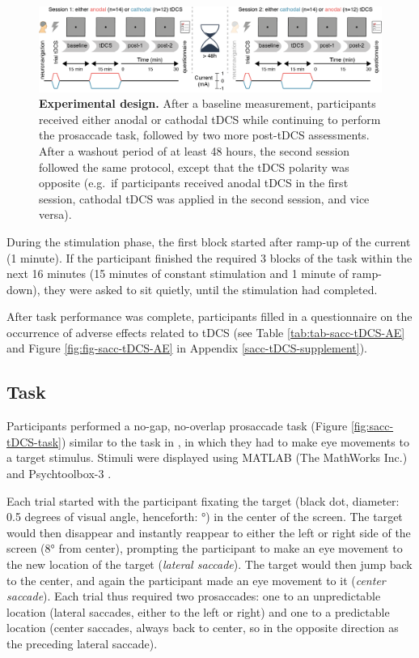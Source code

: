 \documentclass[11pt,english,]{memoir}
\begin{document}
\begin{figure}
\includegraphics[width=130mm]{sacc_tDCS_files/figures/figure_1_procedure} \caption{\textbf{Experimental design.} After a baseline measurement, participants received either anodal or cathodal tDCS while continuing to perform the prosaccade task, followed by two more post-tDCS assessments. After a washout period of at least 48 hours, the second session followed the same protocol, except that the tDCS polarity was opposite (e.g.~if participants received anodal tDCS in the first session, cathodal tDCS was applied in the second session, and vice versa).}\label{fig:sacc-tDCS-procedure}
\end{figure}



During the stimulation phase, the first block started after ramp-up of the current (1 minute). If the participant finished the required 3 blocks of the task within the next 16 minutes (15 minutes of constant stimulation and 1 minute of ramp-down), they were asked to sit quietly, until the stimulation had completed.

After task performance was complete, participants filled in a questionnaire on the occurrence of adverse effects related to tDCS (see Table \ref{tab:tab-sacc-tDCS-AE} and Figure \ref{fig:fig-sacc-tDCS-AE} in Appendix \ref{sacc-tDCS-supplement}).

\hypertarget{sacc-task}{%
\subsection{Task}\label{sacc-task}}

Participants performed a no-gap, no-overlap prosaccade task (Figure \ref{fig:sacc-tDCS-task}) similar to the task in \textcite{Kanai2012}, in which they had to make eye movements to a target stimulus. Stimuli were displayed using MATLAB (The MathWorks Inc.) and Psychtoolbox-3 \autocites{Brainard1997}{Pelli1997}{Kleiner2007}.

Each trial started with the participant fixating the target (black dot, diameter: 0.5 degrees of visual angle, henceforth: °) in the center of the screen. The target would then disappear and instantly reappear to either the left or right side of the screen (8° from center), prompting the participant to make an eye movement to the new location of the target (\emph{lateral saccade}). The target would then jump back to the center, and again the participant made an eye movement to it (\emph{center saccade}). Each trial thus required two prosaccades: one to an unpredictable location (lateral saccades, either to the left or right) and one to a predictable location (center saccades, always back to center, so in the opposite direction as the preceding lateral saccade).
\end{document}
